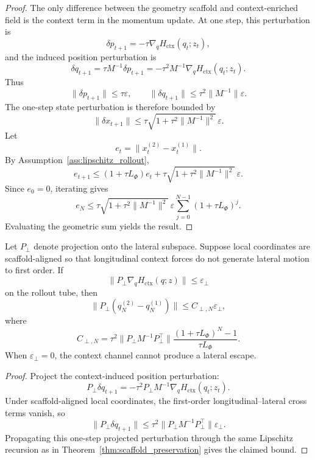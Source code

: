 \begin{proof}
The only difference between the geometry scaffold and context-enriched field is the context term in the
momentum update. At one step, this perturbation is
\[
    \delta p_{t+1}
    =
    -\tau\nabla_qH_{\mathrm{ctx}}(q_t;z_t),
\]
and the induced position perturbation is
\[
    \delta q_{t+1}
    =
    \tau M^{-1}\delta p_{t+1}
    =
    -\tau^2M^{-1}\nabla_qH_{\mathrm{ctx}}(q_t;z_t).
\]
Thus
\[
    \|\delta p_{t+1}\|\le \tau\varepsilon,
    \qquad
    \|\delta q_{t+1}\|\le \tau^2\|M^{-1}\|\varepsilon.
\]
The one-step state perturbation is therefore bounded by
\[
    \|\delta x_{t+1}\|
    \le
    \tau\sqrt{1+\tau^2\|M^{-1}\|^2}\,\varepsilon .
\]
Let
\[
    e_t=\|x_t^{(2)}-x_t^{(1)}\|.
\]
By Assumption~\ref{ass:lipschitz_rollout},
\[
    e_{t+1}
    \le
    (1+\tau L_\Phi)e_t
    +
    \tau\sqrt{1+\tau^2\|M^{-1}\|^2}\,\varepsilon .
\]
Since \(e_0=0\), iterating gives
\[
    e_N
    \le
    \tau\sqrt{1+\tau^2\|M^{-1}\|^2}\,\varepsilon
    \sum_{j=0}^{N-1}(1+\tau L_\Phi)^j .
\]
Evaluating the geometric sum yields the result.
\end{proof}

\begin{corollary}
\label{cor:no_hallucination}
Let \(P_\perp\) denote projection onto the lateral subspace. Suppose local
coordinates are scaffold-aligned so that longitudinal context forces do not generate
lateral motion to first order. If
\[
    \|P_\perp\nabla_qH_{\mathrm{ctx}}(q;z)\|\le \varepsilon_\perp
\]
on the rollout tube, then
\[
    \|P_\perp(q_N^{(2)}-q_N^{(1)})\|
    \le
    C_{\perp,N}\varepsilon_\perp,
\]
where
\[
    C_{\perp,N}
    =
    \tau^2
    \|P_\perp M^{-1}P_\perp^\top\|
    \frac{(1+\tau L_\Phi)^N-1}{\tau L_\Phi}.
\]
When \(\varepsilon_\perp=0\), the context channel cannot produce a lateral escape.
\end{corollary}

\begin{proof}
Project the context-induced position perturbation:
\[
    P_\perp \delta q_{t+1}
    =
    -\tau^2P_\perp M^{-1}\nabla_qH_{\mathrm{ctx}}(q_t;z_t).
\]
Under scaffold-aligned local coordinates, the first-order longitudinal--lateral cross
terms vanish, so
\[
    \|P_\perp \delta q_{t+1}\|
    \le
    \tau^2
    \|P_\perp M^{-1}P_\perp^\top\|
    \varepsilon_\perp .
\]
Propagating this one-step projected perturbation through the same Lipschitz recursion
as in Theorem~\ref{thm:scaffold_preservation} gives the claimed bound.
\end{proof}

